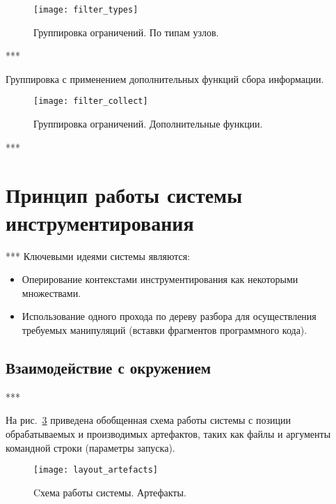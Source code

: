\begin{figure}[H]
	\centering
	\texttt{[image: filter\_types]}
	\caption{Группировка ограничений. По типам узлов.}
	\label{fig:filter_types}
\end{figure}

***

Группировка с применением дополнительных функций сбора информации.

\begin{figure}[H]
	\centering
	\texttt{[image: filter\_collect]}
	\caption{Группировка ограничений. Дополнительные функции.}
	\label{fig:filter_collect}
\end{figure}

***

\section{Принцип работы системы инструментирования}

***
Ключевыми идеями системы являются:
\begin{itemize}[noitemsep]
  \item Оперирование контекстами инструментирования как некоторыми множествами.
  \item Использование одного прохода по дереву разбора для осуществления требуемых манипуляций (вставки фрагментов программного кода).
\end{itemize}

\subsection{Взаимодействие с окружением}

***

На рис.~\ref{fig:layout_artefacts} приведена обобщенная схема работы системы с позиции обрабатываемых и производимых артефактов, таких как файлы и аргументы командной строки (параметры запуска).

\begin{figure}[!h]
	\centering
	\texttt{[image: layout\_artefacts]}
	\caption{Cхема работы системы. Артефакты.}
	\label{fig:layout_artefacts}
\end{figure}


